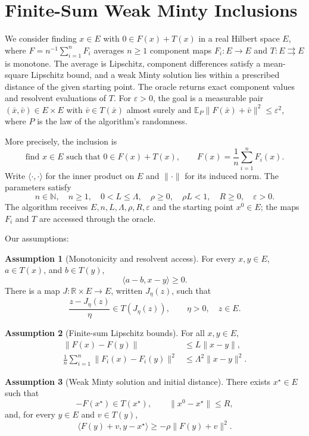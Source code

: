 \documentclass[10pt]{article}
\theoremstyle{definition}
\newtheorem{assumption}{Assumption}
\begin{document}
\section*{Finite-Sum Weak Minty Inclusions}
We consider finding $x\in E$ with $0\in F(x)+T(x)$ in a real Hilbert space $E$, where $F=n^{-1}\sum_{i=1}^n F_i$ averages $n\geq1$ component maps $F_i:E\to E$ and $T:E\rightrightarrows E$ is monotone. The average is Lipschitz, component differences satisfy a mean-square Lipschitz bound, and a weak Minty solution lies within a prescribed distance of the given starting point. The oracle returns exact component values and resolvent evaluations of $T$. For $\varepsilon>0$, the goal is a measurable pair $(\bar{x},\bar{v})\in E\times E$ with $\bar{v}\in T(\bar{x})$ almost surely and $\mathbb{E}_{P}\|F(\bar{x})+\bar{v}\|^2\leq\varepsilon^2$, where $P$ is the law of the algorithm's randomness.

More precisely, the inclusion is
\[
\text{find }x\in E\text{ such that }0\in F(x)+T(x),
\qquad F(x)=\frac1n\sum_{i=1}^n F_i(x).
\]
Write $\langle\cdot,\cdot\rangle$ for the inner product on $E$ and $\|\cdot\|$ for its induced norm. The parameters satisfy
\[
n\in\mathbb{N},\quad n\geq1,\quad
0<L\leq\Lambda,\quad \rho\geq0,\quad
\rho L<1,\quad R\geq0,\quad \varepsilon>0.
\]
The algorithm receives $E,n,L,\Lambda,\rho,R,\varepsilon$ and the starting point $x^0\in E$; the maps $F_i$ and $T$ are accessed through the oracle.

Our assumptions:
\begin{assumption}[Monotonicity and resolvent access]
For every $x,y\in E$, $a\in T(x)$, and $b\in T(y)$,
\[
\langle a-b,x-y\rangle\geq0.
\]
There is a map $J:\mathbb{R}\times E\to E$, written $J_\eta(z)$, such that
\[
\frac{z-J_\eta(z)}{\eta}\in T(J_\eta(z)),
\qquad \eta>0,\quad z\in E.
\]
\end{assumption}

\begin{assumption}[Finite-sum Lipschitz bounds]
For all $x,y\in E$,
\[
\begin{aligned}
\|F(x)-F(y)\|&\leq L\|x-y\|,\\
\frac1n\sum_{i=1}^n\|F_i(x)-F_i(y)\|^2
&\leq\Lambda^2\|x-y\|^2.
\end{aligned}
\]
\end{assumption}

\begin{assumption}[Weak Minty solution and initial distance]
There exists $x^\star\in E$ such that
\[
-F(x^\star)\in T(x^\star),
\qquad \|x^0-x^\star\|\leq R,
\]
and, for every $y\in E$ and $v\in T(y)$,
\[
\langle F(y)+v,y-x^\star\rangle
\geq-\rho\|F(y)+v\|^2.
\]
\end{assumption}
\end{document}
